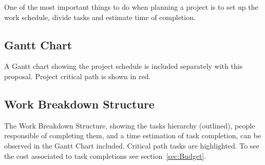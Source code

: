 
One of the most important things to do when
planning a project is to set up the work schedule, divide tasks and estimate
time of completion.

\subsection{Gantt Chart}

A Gantt chart showing the project schedule is included
separately with this proposal. Project critical path is shown in red.

\subsection{Work Breakdown Structure}

The Work Breakdown Structure, showing the
tasks hierarchy (outlined), people responsible  of completing them, and a time
estimation of task completion, can be observed in the
Gantt Chart included. Critical path tasks are highlighted. To see the cost 
associated to task completions see section~\ref{sec:Budget}.
